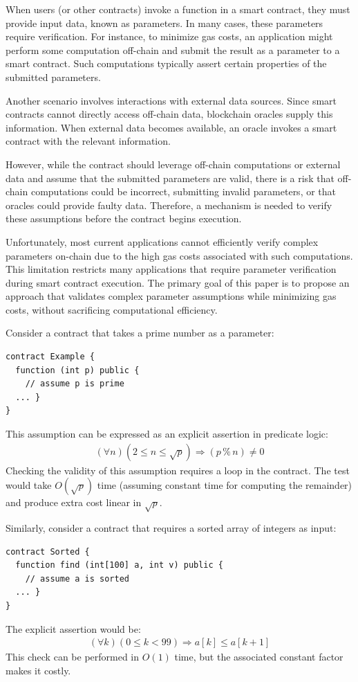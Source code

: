 \documentclass[runningheads]{llncs}
\begin{document}
When users (or other contracts) invoke a function in a smart contract, they must provide input data, known as parameters. In many cases, these parameters require verification. For instance, to minimize gas costs, an application might perform some computation off-chain and submit the result as a parameter to a smart contract. Such computations typically assert certain properties of the submitted parameters.

Another scenario involves interactions with external data sources. Since smart contracts cannot directly access off-chain data, blockchain oracles supply this information. When external data becomes available, an oracle invokes a smart contract with the relevant information.

However, while the contract should leverage off-chain computations or external data and assume that the submitted parameters are valid, there is a risk that off-chain computations could be incorrect, submitting invalid parameters, or that oracles could provide faulty data. Therefore, a mechanism is needed to verify these assumptions before the contract begins execution.

Unfortunately, most current applications cannot efficiently verify complex parameters on-chain due to the high gas costs associated with such computations. This limitation restricts many applications that require parameter verification during smart contract execution. The primary goal of this paper is to propose an approach that validates complex parameter assumptions while minimizing gas costs, without sacrificing computational efficiency.

Consider a contract that takes a prime number as a parameter:
\begin{lstlisting}[numbers=none]
contract Example {
  function (int p) public {
    // assume p is prime 
  ... }
}
\end{lstlisting}
This assumption can be expressed as an explicit assertion in predicate logic:
\begin{gather*}
\label{eq1}
  (\forall n) (2 \leq n \leq \sqrt{p}) \Rightarrow (p \mathbin{\%} n) \ne 0
\end{gather*}
Checking the validity of this assumption requires a loop in the contract. The test would take \(O(\sqrt{p})\) time (assuming constant time for computing the remainder) and produce extra cost linear in \(\sqrt{p}\).

Similarly, consider a contract that requires a sorted array of integers as input:

\begin{lstlisting}[numbers=none]
contract Sorted {
  function find (int[100] a, int v) public {
    // assume a is sorted 
  ... } 
}
\end{lstlisting}
The explicit assertion would be:
\begin{gather*}\label{}
  (\forall k) (0\leq k <99) \Rightarrow a[k] \leq a[k+1]
\end{gather*}
This check can be performed in \(O(1)\) time, but the associated constant factor makes it costly.
\end{document}
